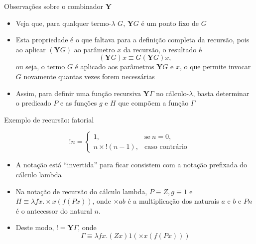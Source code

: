 \begin{frame}[fragile]{Observações sobre o combinador $\mathbf{Y}$}

    \begin{itemize}
        \item Veja que, para qualquer termo-$\lambda$ $G$, $\mathbf{Y}G$ é um ponto fixo de $G$

        \item Esta propriedade é o que faltava para a definição completa da recursão, pois
            ao aplicar $(\mathbf{Y}G)$ ao parâmetro $x$ da recursão, o resultado é 
        \[
            (\mathbf{Y}G)x \equiv G(\mathbf{Y}G)x,
        \]
        ou seja, o termo $G$ é aplicado aos parâmetros $\mathbf{Y}G$ e $x$, o que permite invocar
        $G$ novamente quantas vezes forem necessárias

        \item Assim, para definir uma função recursiva $\mathbf{Y}\Gamma$ no cálculo-$\lambda$, basta 
        determinar o predicado $P$ e as funções $g$ e $H$ que compõem a função $\Gamma$
    \end{itemize}

\end{frame}

\begin{frame}[fragile]{Exemplo de recursão: fatorial}

    \begin{huge}
    \[
        !n =  \left\lbrace \begin{array}{ll}
                    1, & \mbox{se}\ n = 0, \\
                    n \times !(n - 1), & \mbox{caso contrário}
                \end{array} \right.
    \]
    \end{huge}

    \begin{itemize}
        \item A notação está ``invertida'' para ficar consistem com a notação prefixada
            do cálculo lambda

        \item Na notação de recursão do cálculo lambda, $P\equiv Z, g \equiv 1$ e 
            $H\equiv \lambda fx.\times x(f(Px))$, onde $\times ab$ é a multiplicação dos 
            naturais $a$ e $b$ e $Pn$ é o antecessor do natural $n$. 

        \item Deste modo, $! = \mathbf{Y} \Gamma$, onde
        \[
            \Gamma\equiv \lambda fx.(Zx)1(\times x(f(Px)))
        \]
    \end{itemize}
\end{frame}

